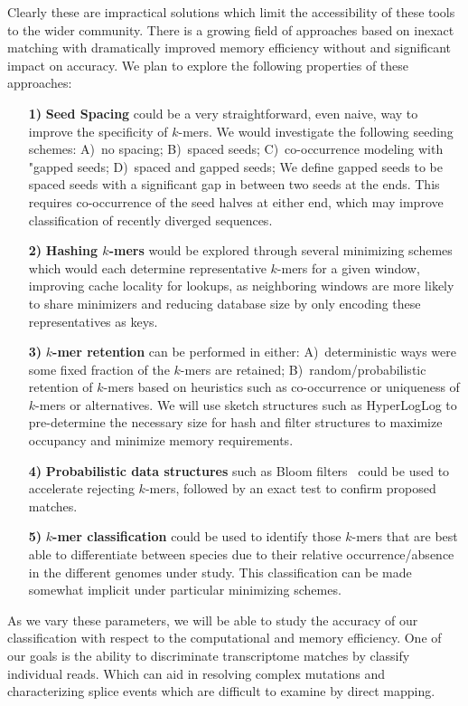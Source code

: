 \documentclass{elsarticle}
\begin{document}
Clearly these are impractical solutions which limit the accessibility
of these tools to the wider community. There is a growing field of
approaches based on inexact matching with dramatically improved memory
efficiency without and significant impact on accuracy. We plan to
explore the following properties of these approaches:
%
\begin{itemize}
%
\item[\textbf{1)}] \textbf{Seed Spacing} could be a very
straightforward, even naive, way to improve the specificity of $k$-mers.
We would investigate the following seeding schemes: A)~no spacing;
B)~spaced seeds; C)~co-occurrence modeling with
"gapped seeds; D)~spaced and gapped seeds; We define gapped seeds to be
spaced seeds with a significant gap in between two seeds at
the ends. This requires co-occurrence of the seed halves at either
end, which may improve classification of recently diverged sequences.
%
\item[\textbf{2)}] \textbf{Hashing $k$-mers} would be explored through
several minimizing schemes which would each determine representative $k$-mers
for a given window, improving cache locality for lookups, as neighboring
windows are more likely to share minimizers and reducing database size by only
encoding these representatives as keys.
%
\item[\textbf{3)}] \textbf{$k$-mer retention} can be performed in
either: A)~deterministic ways were some fixed fraction of the $k$-mers
are retained; B)~random/probabilistic retention of $k$-mers based on
heuristics such as co-occurrence or uniqueness of $k$-mers or alternatives.
We will use sketch structures such as HyperLogLog to pre-determine the
necessary size for hash and filter structures to maximize occupancy
and minimize memory requirements.
%
\item[\textbf{4)}] \textbf{Probabilistic data structures} such as
Bloom filters~\citep{bloom1970acm} could be used to accelerate
rejecting $k$-mers, followed by an exact test to confirm proposed
matches.
%
\item[\textbf{5)}] \textbf{$k$-mer classification} could be used to
identify those $k$-mers that are best able to differentiate between
species due to their relative occurrence/absence in the different
genomes under study. This classification can be made somewhat implicit
under particular minimizing schemes.
%
\end{itemize}

As we vary these parameters, we will be able to study the accuracy of
our classification with respect to the computational and memory
efficiency. One of our goals is the ability to discriminate
transcriptome matches by classify individual reads. Which can aid in
resolving complex mutations and characterizing splice events which are
difficult to examine by direct mapping.
\end{document}

